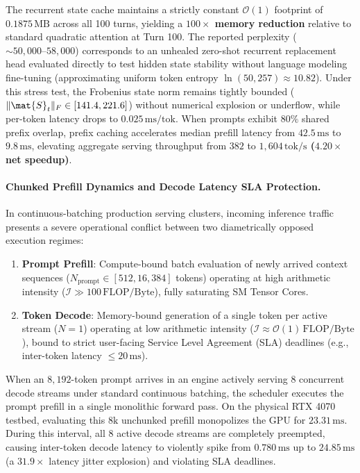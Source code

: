The recurrent state cache maintains a strictly constant $\mathcal{O}(1)$ footprint of $0.1875\,\text{MB}$ across all 100 turns, yielding a \textbf{$100\times$ memory reduction} relative to standard quadratic attention at Turn 100. The reported perplexity ($\sim 50{,}000\text{--}58{,}000$) corresponds to an unhealed zero-shot recurrent replacement head evaluated directly to test hidden state stability without language modeling fine-tuning (approximating uniform token entropy $\ln(50{,}257) \approx 10.82$). Under this stress test, the Frobenius state norm remains tightly bounded ($\|\mat{S}_t\|_F \in [141.4, 221.6]$) without numerical explosion or underflow, while per-token latency drops to $0.025\,\text{ms/tok}$. When prompts exhibit $80\%$ shared prefix overlap, prefix caching accelerates median prefill latency from $42.5\,\text{ms}$ to $9.8\,\text{ms}$, elevating aggregate serving throughput from $382$ to \textbf{$1{,}604\,\text{tok/s}$ ($4.20\times$ net speedup)}.

\paragraph{Chunked Prefill Dynamics and Decode Latency SLA Protection.}
In continuous-batching production serving clusters, incoming inference traffic presents a severe operational conflict between two diametrically opposed execution regimes:
\begin{enumerate}
    \item \textbf{Prompt Prefill}: Compute-bound batch evaluation of newly arrived context sequences ($N_{\text{prompt}} \in [512, 16{,}384]$ tokens) operating at high arithmetic intensity ($\mathcal{I} \gg 100\,\text{FLOP/Byte}$), fully saturating SM Tensor Cores.
    \item \textbf{Token Decode}: Memory-bound generation of a single token per active stream ($N=1$) operating at low arithmetic intensity ($\mathcal{I} \approx \mathcal{O}(1)\,\text{FLOP/Byte}$), bound to strict user-facing Service Level Agreement (SLA) deadlines (e.g., inter-token latency $\le 20\,\text{ms}$).
\end{enumerate}

When an $8{,}192$-token prompt arrives in an engine actively serving 8 concurrent decode streams under standard continuous batching, the scheduler executes the prompt prefill in a single monolithic forward pass. On the physical RTX 4070 testbed, evaluating this $8\text{k}$ unchunked prefill monopolizes the GPU for $23.31\,\text{ms}$. During this interval, all 8 active decode streams are completely preempted, causing inter-token decode latency to violently spike from $0.780\,\text{ms}$ up to $24.85\,\text{ms}$ (a $\mathbf{31.9\times}$ latency jitter explosion) and violating SLA deadlines.

